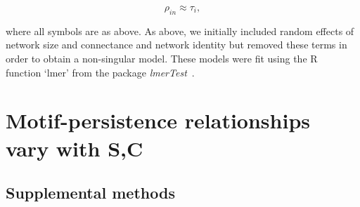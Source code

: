 \documentclass[12pt]{article}
\begin{document}
\begin{spacing}{2.0}
\begin{spacing}{1.0}
\begin{multicols}{2}
        \begin{equation}
            \rho_{in} \approx \tau_{i},
            \label{partic_tl}
        \end{equation}
        \end{multicols}
        \end{spacing}
        
        \noindent where all symbols are as above. 
        As above, we initially included random effects of network size and connectance and network identity but removed these terms in order to obtain a non-singular model.
        These models were fit using the R~\citep{R} function `lmer' from the package \emph{lmerTest}~\citep{lmerTest}.

    		
\clearpage



\section{Motif-persistence relationships vary with S,C}

    \subsection{Supplemental methods}
    

\end{spacing}
\end{document}
